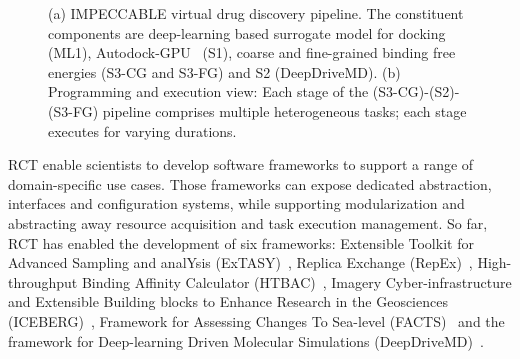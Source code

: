 \documentclass[preprint,12pt, a4paper]{elsarticle}
\begin{document}
\begin{figure}[h]
        \centering
        \qquad
        \caption{(a) IMPECCABLE virtual drug discovery pipeline. The constituent
        components are deep-learning based surrogate model for docking (ML1),
        Autodock-GPU~\cite{legrand2020gpu} (S1), coarse and fine-grained binding
        free energies (S3-CG and S3-FG) and S2 (DeepDriveMD). (b) Programming
        and execution view: Each stage of the (S3-CG)-(S2)-(S3-FG) pipeline
        comprises multiple heterogeneous tasks; each stage executes for varying
        durations.}\label{fig:impeccable}
\end{figure}

RCT enable scientists to develop software frameworks to support a range of
domain-specific use cases. Those frameworks can expose dedicated abstraction,
interfaces and configuration systems, while supporting modularization and
abstracting away resource acquisition and task execution management. So far, RCT
has enabled the development of six frameworks: Extensible Toolkit for
Advanced Sampling and analYsis (ExTASY)~\cite{balasubramanian2016extasy},
Replica Exchange (RepEx)~\cite{treikalis2016repex}, High-throughput Binding
Affinity Calculator (HTBAC)~\cite{dakka2018high}, Imagery Cyber-infrastructure
and Extensible Building blocks to Enhance Research in the Geosciences
(ICEBERG)~\cite{paraskevakos2019workflow}, Framework for Assessing Changes To
Sea-level (FACTS)~\cite{kopp2023framework} and the framework for Deep-learning
Driven Molecular Simulations (DeepDriveMD)~\cite{lee2019deepdrivemd}.
\end{document}
